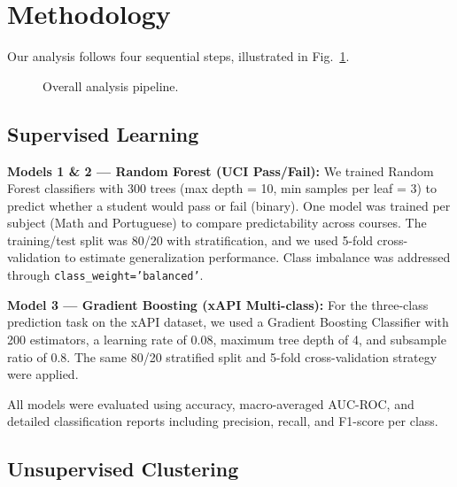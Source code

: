 \documentclass[conference]{IEEEtran}
\begin{document}
\section{Methodology}

Our analysis follows four sequential steps, illustrated in Fig.~\ref{fig:pipeline}.

\begin{figure}[htbp]
  \centering
  \caption{Overall analysis pipeline.}
  \label{fig:pipeline}
\end{figure}

\subsection{Supervised Learning}

\textbf{Models 1 \& 2 — Random Forest (UCI Pass/Fail):} We trained Random Forest classifiers with 300 trees (max depth = 10, min samples per leaf = 3) to predict whether a student would pass or fail (binary). One model was trained per subject (Math and Portuguese) to compare predictability across courses. The training/test split was 80/20 with stratification, and we used 5-fold cross-validation to estimate generalization performance. Class imbalance was addressed through \texttt{class\_weight='balanced'}.

\textbf{Model 3 — Gradient Boosting (xAPI Multi-class):} For the three-class prediction task on the xAPI dataset, we used a Gradient Boosting Classifier with 200 estimators, a learning rate of 0.08, maximum tree depth of 4, and subsample ratio of 0.8. The same 80/20 stratified split and 5-fold cross-validation strategy were applied.

All models were evaluated using accuracy, macro-averaged AUC-ROC, and detailed classification reports including precision, recall, and F1-score per class.

\subsection{Unsupervised Clustering}
\end{document}
